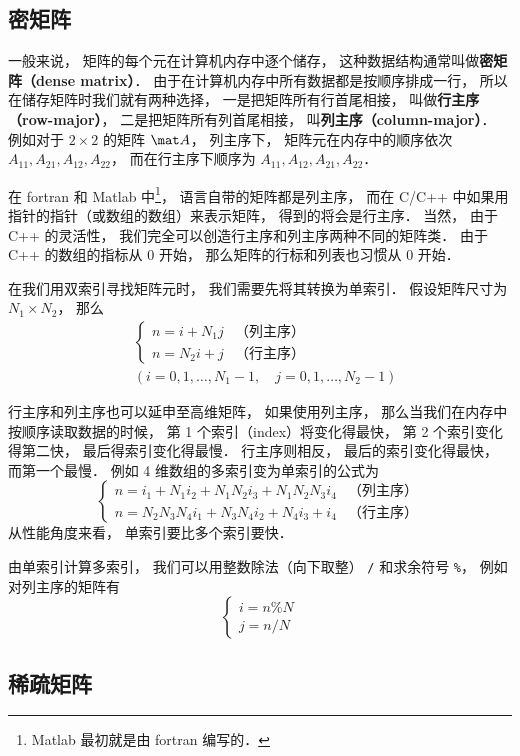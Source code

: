 
\begin{issues}
\issueTODO
\end{issues}

\subsection{密矩阵}
一般来说， 矩阵的每个元在计算机内存中逐个储存， 这种数据结构通常叫做\textbf{密矩阵（dense matrix）}． 由于在计算机内存中所有数据都是按顺序排成一行， 所以在储存矩阵时我们就有两种选择， 一是把矩阵所有行首尾相接， 叫做\textbf{行主序（row-major）}， 二是把矩阵所有列首尾相接， 叫\textbf{列主序（column-major）}． 例如对于 $2 \times 2$ 的矩阵 $\mat A$， 列主序下， 矩阵元在内存中的顺序依次 $A_{11}, A_{21}, A_{12}, A_{22}$， 而在行主序下顺序为 $A_{11},A_{12},A_{21},A_{22}$．

在 fortran 和 Matlab 中\footnote{Matlab 最初就是由 fortran 编写的．}， 语言自带的矩阵都是列主序， 而在 C/C++ 中如果用指针的指针（或数组的数组）来表示矩阵， 得到的将会是行主序． 当然， 由于 C++ 的灵活性， 我们完全可以创造行主序和列主序两种不同的矩阵类． 由于 C++ 的数组的指标从 0 开始， 那么矩阵的行标和列表也习惯从 0 开始．

在我们用双索引寻找矩阵元时， 我们需要先将其转换为单索引． 假设矩阵尺寸为 $N_1 \times N_2$， 那么
\begin{equation}
\begin{aligned}
&\begin{cases}
n = i + N_1 j  &\text{（列主序）}\\
n = N_2 i + j  &\text{（行主序）}
\end{cases}\\
&(i = 0, 1, \dots, N_1-1,\quad j = 0, 1, \dots, N_2-1)
\end{aligned}
\end{equation}

行主序和列主序也可以延申至高维矩阵， 如果使用列主序， 那么当我们在内存中按顺序读取数据的时候， 第 1 个索引（index）将变化得最快， 第 2 个索引变化得第二快， 最后得索引变化得最慢． 行主序则相反， 最后的索引变化得最快， 而第一个最慢． 例如 4 维数组的多索引变为单索引的公式为
\begin{equation}
\begin{cases}
n = i_1 + N_1 i_2 + N_1 N_2 i_3 + N_1 N_2 N_3 i_4  &\text{（列主序）}\\
n = N_2 N_3 N_4 i_1 + N_3 N_4 i_2 + N_4 i_3 + i_4  &\text{（行主序）}
\end{cases}
\end{equation}
从性能角度来看， 单索引要比多个索引要快．

由单索引计算多索引， 我们可以用整数除法（向下取整） \verb|/| 和求余符号 \verb|%|， 例如对列主序的矩阵有
\begin{equation}
\begin{cases}
i = n \% N\\
j = n / N
\end{cases}
\end{equation}

\subsection{稀疏矩阵}
